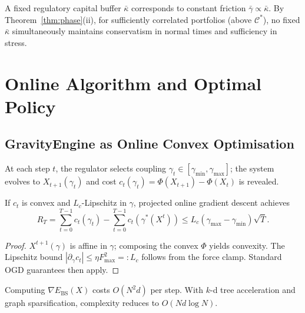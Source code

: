\documentclass[final]{siamltex}
\providecommand{\grad}{\nabla}
\newcommand{\Ebs}{E_{\mathrm{BS}}}
\newcommand{\Cman}{\mathcal{C}^*}
\begin{document}
\begin{corollary}\label{cor:procyclical}
A fixed regulatory capital buffer $\bar{\kappa}$ \cite{basel2010} corresponds to
constant friction $\bar{\gamma}\propto\bar{\kappa}$. By
Theorem~\ref{thm:phase}(ii), for sufficiently correlated
portfolios (above $\Cman$), no fixed $\bar{\kappa}$ simultaneously
maintains conservatism in normal times and sufficiency in stress.
\end{corollary}


\section{Online Algorithm and Optimal Policy}\label{sec:online}

\subsection{GravityEngine as Online Convex Optimisation}

At each step $t$, the regulator selects coupling
$\gamma_t\in[\gamma_{\min},\gamma_{\max}]$; the system evolves to
$X_{t+1}(\gamma_t)$ and cost
$c_t(\gamma_t)=\Phi(X_{t+1})-\Phi(X_t)$ is revealed.

\begin{proposition}\label{prop:regret}
If $c_t$ is convex and $L_c$-Lipschitz in $\gamma$, projected
online gradient descent achieves
\begin{equation}\label{eq:regret}
  R_T = \sum_{t=0}^{T-1}c_t(\gamma_t)
  - \sum_{t=0}^{T-1}c_t(\gamma^*(X^t))
  \le L_c(\gamma_{\max}-\gamma_{\min})\sqrt{T}.
\end{equation}
\end{proposition}

\begin{proof}
$X^{t+1}(\gamma)$ is affine in $\gamma$; composing the convex
$\Phi$ yields convexity. The Lipschitz bound
$|\partial_\gamma c_t|\le\eta F_{\max}^2=:L_c$ follows from the
force clamp. Standard OGD guarantees
\cite{hazan2016oco,shalev2012online} then apply.
\end{proof}

\begin{proposition}\label{prop:complexity}
Computing $\grad\Ebs(X)$ costs $O(N^2 d)$ per step. With $k$-d
tree acceleration and graph sparsification, complexity reduces to
$O(Nd\log N)$.
\end{proposition}
\end{document}
